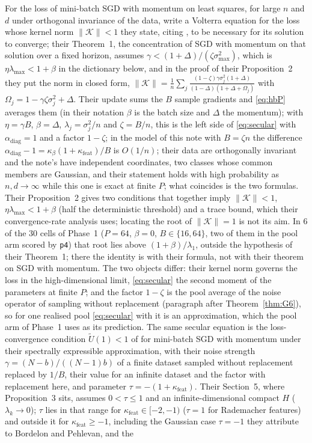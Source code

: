 \documentclass[11pt]{article}
\theoremstyle{remark}
\begin{document}
For the loss of mini-batch SGD with momentum on least squares, for large $n$ and $d$ under orthogonal invariance of the data, \citet{lee2022minibatch} write a Volterra equation for the loss whose kernel norm $\|\mathcal K\|<1$ they state, citing \citet[Proposition~7.4]{asmussen2003}, to be necessary for its solution to converge; their Theorem~1, the concentration of SGD with momentum on that solution over a fixed horizon, assumes $\gamma<(1+\Delta)/(\zeta\sigma_{\max}^2)$, which is $\eta\lambda_{\max}<1+\beta$ in the dictionary below, and in the proof of their Proposition~2 they put the norm in closed form, $\|\mathcal K\|=\frac1n\sum_j\frac{(1-\zeta)\gamma\sigma_j^2(1+\Delta)}{(1-\Delta)(1+\Delta+\Omega_j)}$ with $\Omega_j=1-\gamma\zeta\sigma_j^2+\Delta$. Their update sums the $B$ sample gradients and \eqref{eq:hbP} averages them (in their notation $\beta$ is the batch size and $\Delta$ the momentum); with $\eta=\gamma B$, $\beta=\Delta$, $\lambda_j=\sigma_j^2/n$ and $\zeta=B/n$, this is the left side of \eqref{eq:secular} with $\alpha_{\mathrm{diag}}=1$ and a factor $1-\zeta$; in the model of this note with $B=\zeta n$ the difference $\alpha_{\mathrm{diag}}-1=\kappa_\beta(1+\kappa_{\mathrm{feat}})/B$ is $O(1/n)$; their data are orthogonally invariant and the note's have independent coordinates, two classes whose common members are Gaussian, and their statement holds with high probability as $n,d\to\infty$ while this one is exact at finite $P$; what coincides is the two formulas. Their Proposition~2 gives two conditions that together imply $\|\mathcal K\|<1$, $\eta\lambda_{\max}<1+\beta$ (half the deterministic threshold) and a trace bound, which their convergence-rate analysis uses; locating the root of $\|\mathcal K\|=1$ is not its aim. In 6 of the 30 cells of Phase~1 ($P=64$, $\beta=0$, $B\in\{16,64\}$, two of them in the pool arm scored by \texttt{p4}) that root lies above $(1+\beta)/\lambda_1$, outside the hypothesis of their Theorem~1; there the identity is with their formula, not with their theorem on SGD with momentum. The two objects differ: their kernel norm governs the loss in the high-dimensional limit, \eqref{eq:secular} the second moment of the parameters at finite $P$; and the factor $1-\zeta$ is the pool average of the noise operator of sampling without replacement (paragraph after Theorem~\ref{thm:G6}), so for one realised pool \eqref{eq:secular} with it is an approximation, which the pool arm of Phase~1 uses as its prediction. The same secular equation is the loss-convergence condition $\widetilde U(1)<1$ of \citet[eq.~(21) and the paragraph after Proposition~3]{velikanov2023view} for mini-batch SGD with momentum under their spectrally expressible approximation, with their noise strength $\gamma=(N-b)/((N-1)b)$ of a finite dataset sampled without replacement replaced by $1/B$, their value for an infinite dataset and the factor with replacement here, and parameter $\tau=-(1+\kappa_{\mathrm{feat}})$. Their Section~5, where Proposition~3 sits, assumes $0<\tau\le1$ and an infinite-dimensional compact $H$ ($\lambda_k\to0$); $\tau$ lies in that range for $\kappa_{\mathrm{feat}}\in[-2,-1)$ ($\tau=1$ for Rademacher features) and outside it for $\kappa_{\mathrm{feat}}\ge-1$, including the Gaussian case $\tau=-1$ they attribute to Bordelon and Pehlevan, and the 
\end{document}
